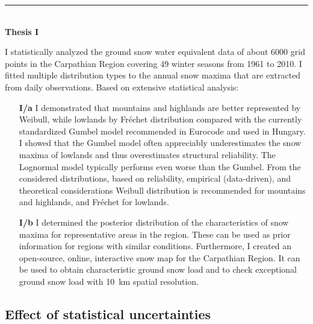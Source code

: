\begin{center}
	\noindent\rule[0.5ex]{0.5\linewidth}{0.5pt} \\[10pt]
	\textbf{Thesis I} \hfill \\[13pt]
\end{center}
I statistically analyzed the ground snow water equivalent data of about 6000 grid points in the Carpathian Region covering 49 winter seasons from 1961 to 2010. I fitted multiple distribution types to the annual snow maxima that are extracted from daily observations. Based on extensive statistical analysis:
\begin{enumerate}[leftmargin=*, align=left, labelwidth=*]
	\item[\textbf{I/a}] I demonstrated that mountains and highlands are better represented by Weibull, while lowlands by Fréchet distribution compared with the currently standardized Gumbel model recommended in Eurocode and used in Hungary. I showed that the Gumbel model often appreciably underestimates the snow maxima of lowlands and thus overestimates structural reliability. The Lognormal model typically performs even worse than the Gumbel. From the considered distributions, based on reliability, empirical (data-driven), and theoretical considerations Weibull distribution is recommended for mountains and highlands, and Fréchet for lowlands.
	
	\item[\textbf{I/b}] I determined the posterior distribution of the characteristics of snow maxima for representative areas in the region. These can be used as prior information for regions with similar conditions. Furthermore, I created an open-source, online, interactive snow map for the Carpathian Region. It can be used to obtain characteristic ground snow load and to check exceptional ground snow load with 10~km spatial resolution. 
\end{enumerate}

\citep{RozsasAMM2016, RozsasESREL2015, VighTO2016, RozsasIABSE2015}

\subsection{Effect of statistical uncertainties}


